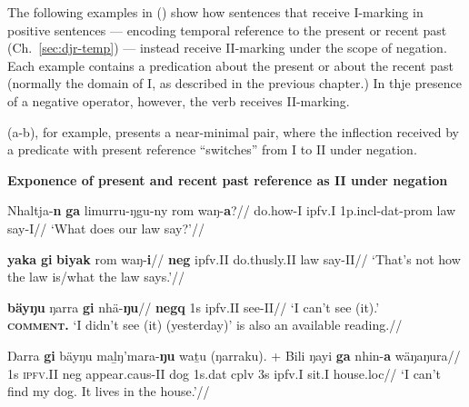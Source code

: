 The following examples in () show how sentences that receive \gls{I}-marking in positive sentences --- encoding temporal reference to the present or recent past (Ch.~\ref{sec:djr-temp}) --- instead receive \gls{II}-marking under the scope of negation. Each example contains a predication about the present or about the recent past (normally the domain of \gls{I}, as described in the previous chapter.) In thje presence of a negative operator, however, the verb receives \gls{II}-marking. 

(a-b), for example, presents a near-minimal pair, where the inflection received by a predicate with present reference ``switches'' from \gls{I} to \gls{II} under negation.

\pex\textbf{Exponence of present and recent past reference as \gls{II} under negation}


\a\begingl%
\gla Nhaltja-\textbf{n} \textbf{ga} limurru-ŋgu-ny rom waŋ-\textbf{a}?//
\glb do.how-\gls{I} \gls{ipfv}.\gls{I} 1p.\gls{incl}-\gls{dat}-\gls{prom} law say-\gls{I}//
\glft`What does our law say?'//\endgl

\a\begingl%
\gla \textbf{yaka} \textbf{gi} \textbf{biyak} rom waŋ-\textbf{i}//
\glb \textbf{\gls{neg}} \gls{ipfv}.\gls{II} do.thusly.\gls{II} law say-\gls{II}//
\glft`That's not how the law is/what the law says.'//\endgl 




\a\begingl%
\gla \textbf{bäyŋu} ŋarra \textbf{gi} nhä-\textbf{ŋu}//
\glb \textbf{\gls{negq}} 1s \gls{ipfv}.\gls{II} see-\gls{II}//
\glft`I can't see (it).'\\
\textsc{\textbf{comment.}} `I didn't see (it) (yesterday)' is also an available reading.\trailingcitation{[AW 2018030]}//\endgl



\a\begingl\gla Ŋarra \textbf{gi} bäyŋu maḻŋ'mara-\textbf{ŋu} waṯu (ŋarraku). + Bili ŋayi \textbf{ga} nhin-\textbf{a} wäŋaŋura//
\glb 1s \textsc{ipfv}.II \gls{neg} appear.\gls{caus}-\gls{II} dog 1s.\gls{dat} \gls{cplv} 3s \gls{ipfv}.\gls{I} sit.\gls{I} house.\gls{loc}//
\glft`I can't find my dog. It lives in the house.'\trailingcitation{[DhG~20190417]}//\endgl



